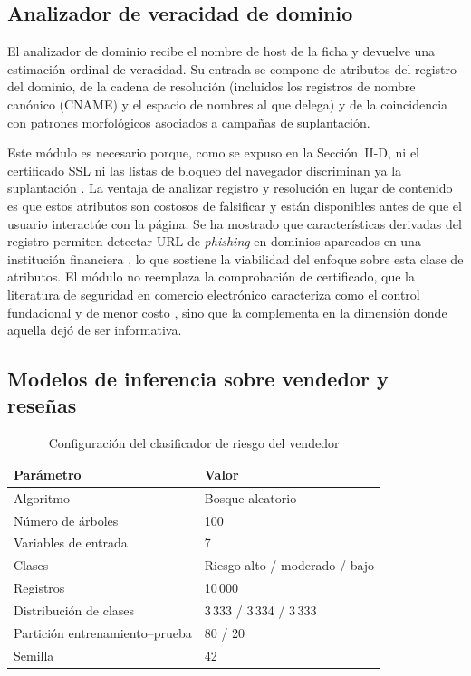 \subsection{Analizador de veracidad de dominio}

El analizador de dominio recibe el nombre de host de la ficha y devuelve una estimación
ordinal de veracidad. Su entrada se compone de atributos del registro del dominio, de la
cadena de resolución (incluidos los registros de nombre canónico (CNAME) y el espacio de nombres al que delega) y
de la coincidencia con patrones morfológicos asociados a campañas de suplantación.

Este módulo es necesario porque, como se expuso en la Sección~II-D, ni el certificado SSL ni
las listas de bloqueo del navegador discriminan ya la suplantación \cite{ref25}. La ventaja de
analizar registro y resolución en lugar de contenido es que estos atributos son costosos de
falsificar y están disponibles antes de que el usuario interactúe con la página.
Se ha mostrado que características derivadas del registro permiten detectar URL de
\textit{phishing} en dominios aparcados en una institución financiera \cite{ref7}, lo que
sostiene la viabilidad del enfoque sobre esta clase de atributos. El
módulo no reemplaza la comprobación de certificado, que la literatura de seguridad en
comercio electrónico caracteriza como el control fundacional y de menor costo
\cite{ref30}, sino que la complementa en la dimensión donde aquella dejó de ser informativa.

\subsection{Modelos de inferencia sobre vendedor y reseñas}

\begin{table}[t]
\caption{Configuración del clasificador de riesgo del vendedor}
\label{tab:rf}
\centering
\footnotesize
\renewcommand{\arraystretch}{1.12}
\begin{tabular}{@{}p{4.3cm}p{3.4cm}@{}}
\toprule
\textbf{Parámetro} & \textbf{Valor} \\
\midrule
Algoritmo                     & Bosque aleatorio \\
Número de árboles             & 100 \\
Variables de entrada          & 7 \\
Clases                        & Riesgo alto / moderado / bajo \\
Registros                     & 10\,000 \\
Distribución de clases        & 3\,333 / 3\,334 / 3\,333 \\
Partición entrenamiento--prueba & 80 / 20 \\
Semilla                       & 42 \\
\bottomrule
\end{tabular}
\end{table}

